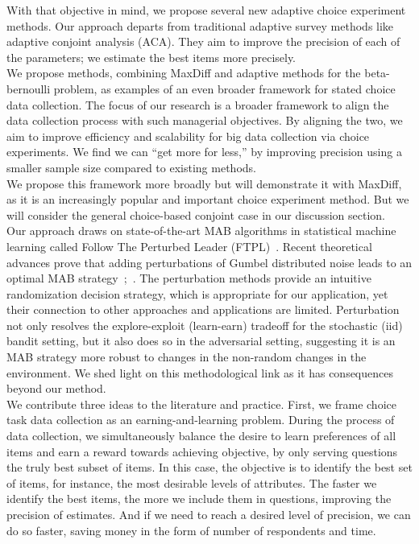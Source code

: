 \documentclass[nonblindrev]{informs3}
\begin{document}
With that objective in mind, we propose several new adaptive choice experiment methods. 
Our approach departs from traditional adaptive survey methods like adaptive conjoint analysis (ACA). They aim to improve the precision of each of the parameters; we estimate the best items more precisely. \\
We propose methods, combining MaxDiff and adaptive methods for the beta-bernoulli problem, as examples of an even broader framework for stated choice data collection. The focus of our research is a broader framework to align the data collection process with such managerial objectives. By aligning the two, we aim to improve efficiency and scalability for big data collection via choice experiments. We find we can ``get more for less,'' by improving precision using a smaller sample size compared to existing methods.\\
We propose this framework more broadly but will demonstrate it with MaxDiff, as it is an increasingly popular and important choice experiment method. But we will consider the general choice-based conjoint case in our discussion section. \\
Our approach draws on state-of-the-art MAB algorithms in statistical machine learning called Follow The Perturbed Leader (FTPL)~\cite{kalai2005efficient}. Recent theoretical advances prove that adding perturbations of Gumbel distributed noise leads to an optimal MAB strategy~\cite{abernethy2015fighting};~\cite{kujala2005following}. The perturbation methods provide an intuitive randomization decision strategy, which is appropriate for our application, yet their connection to other approaches and applications are limited. Perturbation not only resolves the explore-exploit (learn-earn) tradeoff for the stochastic (iid) bandit setting, but it also does so in the adversarial setting, suggesting it is an MAB strategy more robust to changes in the non-random changes in the environment. We shed light on this methodological link as it has consequences beyond our method.\\
We contribute three ideas to the literature and practice. First, we frame choice task data collection as an earning-and-learning problem. During the process of data collection, we simultaneously balance the desire to learn preferences of all items and earn a reward towards achieving objective, by only serving questions the truly best subset of items. In this case, the objective is to identify the best set of items, for instance, the most desirable levels of attributes. The faster we identify the best items, the more we include them in questions, improving the precision of estimates. And if we need to reach a desired level of precision, we can do so faster, saving money in the form of number of respondents and time. %
\end{document}
